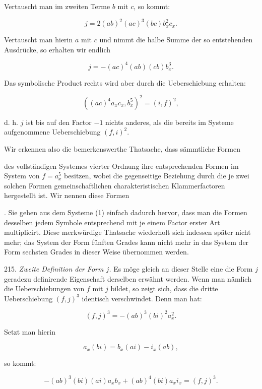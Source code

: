 Vertauscht man im zweiten Terme $b$ mit $c$, so kommt:

\[ j = 2 (ab)^2 (ac)^3 (bc) b_x^2 c_x. \]

Vertauscht man hierin $a$ mit $c$ und nimmt die halbe Summe der so
entstehenden Ausdrücke, so erhalten wir endlich

\[ j = -(ac)^4 (ab) (cb) b_x^3. \]

Das symbolische Product rechts wird aber durch die Ueberschiebung
erhalten:

\[ ((ac)^4 a_x c_x, b_x^5)^2 = (i, f)^2, \]



d. h. $j$ ist bis auf den Factor $-1$ nichts anderes, als die bereits im
Systeme aufgenommene Ueberschiebung $(f, i)^2$.

Wir erkennen also die bemerkenswerthe Thatsache, dass sämmtliche
Formen


des vollständigen Systemes vierter Ordnung ihre entsprechenden
Formen im System von $f = a_x^5$ besitzen, wobei die gegenseitige Beziehung
 durch die je zwei solchen Formen gemeinschaftlichen charakteristischen
 Klammerfactoren hergestellt ist. Wir nennen diese Formen


. Sie gehen aus dem Systeme (1) einfach
dadurch hervor, dass man die Formen desselben jedem Symbole entsprechend
 mit je einem Factor erster Art multiplicirt. Diese merkwürdige
 Thatsache wiederholt sich indessen später nicht mehr; das
System der Form fünften Grades kann nicht mehr in das System der
Form sechsten Grades in dieser Weise übernommen werden.

215. \textit{Zweite Definition der Form $j$.} Es möge gleich an dieser
Stelle eine die Form $j$ geradezu definirende Eigenschaft derselben
erwähnt werden. Wenn man nämlich die Ueberschiebungen von $f$ mit
$j$ bildet, so zeigt sich, dass die dritte Ueberschiebung $(f, j)^3$ identisch
verschwindet. Denn man hat:

\[ (f, j)^3 = -(ab)^3 (bi)^2 a_x^2. \]

Setzt man hierin

\[ a_x (bi) = b_x (ai) - i_x (ab), \]

so kommt:

\[ -(ab)^3 (bi) (ai) a_x b_x + (ab)^4 (bi) a_x i_x = (f, j)^3. \]

